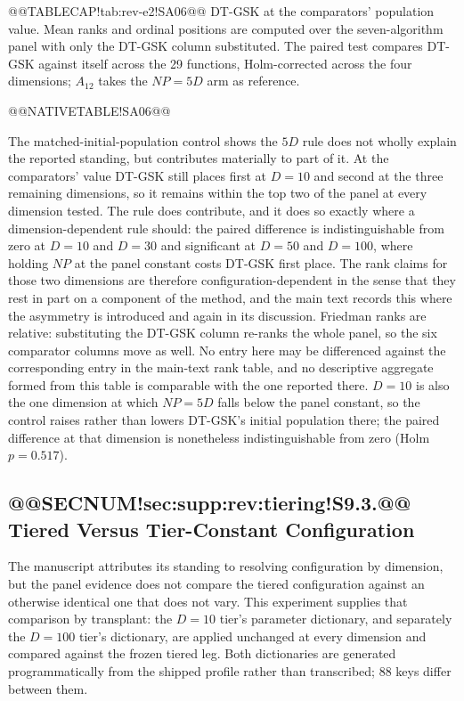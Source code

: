 \documentclass[10pt,a4paper]{article}
\newcommand{\dtgsk}{DT-GSK}
\begin{document}
@@TABLECAP!tab:rev-e2!SA06@@ \dtgsk{} at the comparators' population value.  Mean ranks and ordinal
positions are computed over the seven-algorithm panel with only the \dtgsk{}
column substituted.  The paired test compares \dtgsk{} against itself across the
29 functions, Holm-corrected across the four dimensions; $A_{12}$ takes the
$NP = 5D$ arm as reference.

@@NATIVETABLE!SA06@@




The matched-initial-population control shows the $5D$ rule does not wholly
explain the reported standing, but contributes materially to part of it.  At the
comparators' value \dtgsk{} still places first at $D = 10$ and second at the
three remaining dimensions, so it remains within the top two of the panel at
every dimension tested.  The rule does contribute, and it does so exactly where
a dimension-dependent rule should: the paired difference is indistinguishable
from zero at $D = 10$ and $D = 30$ and significant at $D = 50$ and $D = 100$,
where holding $NP$ at the panel constant costs \dtgsk{} first place.  The rank
claims for those two dimensions are therefore configuration-dependent in the
sense that they rest in part on a component of the method, and the main text
records this where the asymmetry is introduced and again in its discussion.
  Friedman ranks are relative:
substituting the \dtgsk{} column re-ranks the whole panel, so the six
comparator columns move as well.  No entry here may be differenced against the
corresponding entry in the main-text rank table, and no descriptive aggregate
formed from this table is comparable with the one reported there.  $D = 10$ is
also the one dimension at which $NP = 5D$ falls below the panel constant, so
the control raises rather than lowers \dtgsk{}'s initial population there; the
paired difference at that dimension is nonetheless indistinguishable from zero
(Holm $p = 0.517$).


\subsection{@@SECNUM!sec:supp:rev:tiering!S9.3.@@ Tiered Versus Tier-Constant Configuration}\label{sec:supp:rev:tiering}

The manuscript attributes its standing to resolving configuration by dimension,
but the panel evidence does not compare the tiered configuration against an
otherwise identical one that does not vary.  This experiment supplies that
comparison by transplant: the $D = 10$ tier's parameter dictionary, and separately
the $D = 100$ tier's dictionary, are applied unchanged at every dimension and
compared against the frozen tiered leg.  Both dictionaries are generated
programmatically from the shipped profile rather than transcribed; 88 keys
differ between them.
\end{document}
